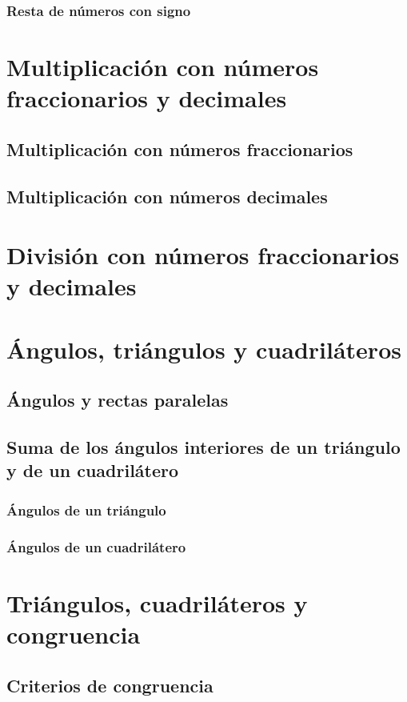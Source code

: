 \documentclass[11pt]{book}
\begin{document}
\subsubsection{Resta de n\'umeros con signo}

\section{Multiplicaci\'on con n\'umeros fraccionarios y decimales}
\subsection{Multiplicaci\'on con n\'umeros fraccionarios}
\subsection{Multiplicaci\'on con n\'umeros decimales}

\section{Divisi\'on con n\'umeros fraccionarios y decimales}

\section{\'Angulos, tri\'angulos y cuadril\'ateros}
\subsection{\'Angulos y rectas paralelas}
\subsection{Suma de los \'angulos interiores de un tri\'angulo y de un cuadril\'atero}
\subsubsection{\'Angulos de un tri\'angulo}
\subsubsection{\'Angulos de un cuadril\'atero}

\section{Tri\'angulos, cuadril\'ateros y congruencia}
\subsection{Criterios de congruencia}
\end{document}
